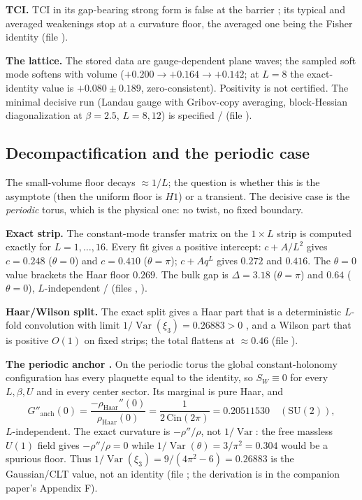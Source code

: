 \textbf{TCI.} TCI in its gap-bearing strong form is false at the barrier \LN; its typical and averaged
weakenings stop at a curvature floor, the averaged one being the Fisher identity \LT{} (file
).

\textbf{The lattice.} The stored data are gauge-dependent plane waves; the sampled soft mode softens
with volume ($+0.200\to+0.164\to+0.142$; at $L=8$ the exact-identity value is $+0.080\pm0.189$,
zero-consistent). Positivity is not certified. The minimal decisive run (Landau gauge with
Gribov-copy averaging, block-Hessian diagonalization at $\beta=2.5$, $L=8,12$) is specified \LE/\LM{}
(file ).

\subsection{Decompactification and the periodic case}
\label{ch:uvface-periodic}

The small-volume floor decays $\approx1/L$; the question is whether this is the asymptote (then the
uniform floor is $H1$) or a transient. The decisive case is the \emph{periodic} torus, which is the
physical one: no twist, no fixed boundary.

\textbf{Exact strip.} The constant-mode transfer matrix on the $1\times L$ strip is computed exactly
for $L=1,\dots,16$. Every fit gives a positive intercept: $c+A/L^2$ gives $c=0.248$ ($\theta=0$) and
$c=0.410$ ($\theta=\pi$); $c+Aq^L$ gives $0.272$ and $0.416$. The $\theta=0$ value brackets the Haar
floor $0.269$. The bulk gap is $\Delta=3.18$ ($\theta=\pi$) and $0.64$ ($\theta=0$), $L$-independent
\LT/\LE{} (files , ).

\textbf{Haar/Wilson split.} The exact split gives a Haar part that is a deterministic $L$-fold
convolution with limit $1/\operatorname{Var}(\xi_3)=0.26883>0$ \LT, and a Wilson part that is positive
$O(1)$ on fixed strips; the total flattens at $\approx0.46$ (file ).

\textbf{The periodic anchor \LT.} On the periodic torus the global constant-holonomy configuration
has every plaquette equal to the identity, so $S_W\equiv0$ for every $L,\beta,U$ and in every center
sector. Its marginal is pure Haar, and
\begin{equation}
  G''_{\mathrm{anch}}(0)=\frac{-\rho_{\mathrm{Haar}}''(0)}{\rho_{\mathrm{Haar}}(0)}
  =\frac{1}{2\,\mathrm{Cin}(2\pi)}=0.20511530\quad(\mathrm{SU}(2)),
  \label{eq:v3anchor}
\end{equation}
$L$-independent. The exact curvature is $-\rho''/\rho$, not $1/\operatorname{Var}$: the free massless
$U(1)$ field gives $-\rho''/\rho=0$ while $1/\operatorname{Var}(\theta)=3/\pi^2=0.304$ would be a
spurious floor. Thus $1/\operatorname{Var}(\xi_3)=9/(4\pi^2-6)=0.26883$ is the Gaussian/CLT value,
not an identity (file ; the derivation is in the companion paper's
Appendix F).


